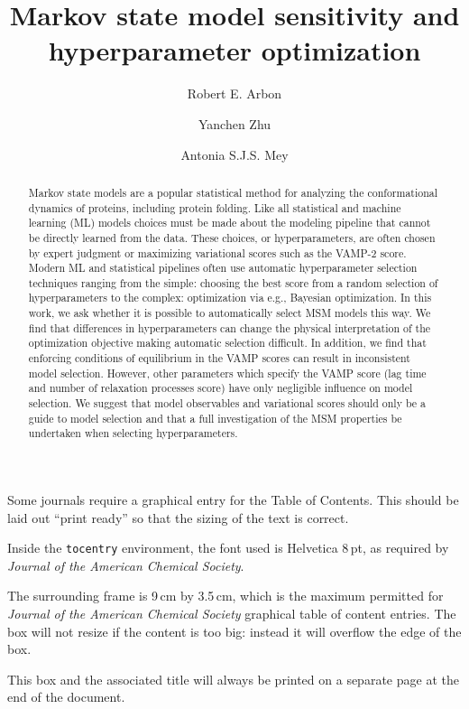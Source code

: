 \documentclass[journal=jacsat,manuscript=article]{achemso}
\author{Robert E. Arbon}
\author{Yanchen Zhu}
\author{Antonia S.J.S. Mey}
\affiliation{EaStCHEM School of Chemistry, David Brewster Road, Joseph Black Building, The King’s Buildings, Edinburgh, EH93FJ, UK}
\title[]{Markov state model sensitivity and hyperparameter optimization}
\begin{document}
\begin{tocentry}

Some journals require a graphical entry for the Table of Contents.
This should be laid out ``print ready'' so that the sizing of the
text is correct.

Inside the \texttt{tocentry} environment, the font used is Helvetica
8\,pt, as required by \emph{Journal of the American Chemical
Society}.

The surrounding frame is 9\,cm by 3.5\,cm, which is the maximum
permitted for  \emph{Journal of the American Chemical Society}
graphical table of content entries. The box will not resize if the
content is too big: instead it will overflow the edge of the box.

This box and the associated title will always be printed on a
separate page at the end of the document.

\end{tocentry}

\begin{abstract}
Markov state models are a popular statistical method for analyzing the conformational dynamics of proteins, including protein folding. Like all statistical and machine learning (ML) models choices must be made about the modeling pipeline that cannot be directly learned from the data. These choices, or hyperparameters, are often chosen by expert judgment or maximizing variational scores such as the VAMP-2 score. Modern ML and statistical pipelines often use automatic hyperparameter selection techniques ranging from the simple: choosing the best score from a random selection of hyperparameters to the complex: optimization via e.g., Bayesian optimization. In this work, we ask whether it is possible to automatically select MSM models this way. We find that differences in hyperparameters can change the physical interpretation of the optimization objective making automatic selection difficult. In addition, we find that enforcing conditions of equilibrium in the VAMP scores can result in inconsistent model selection. However, other parameters which specify the VAMP score (lag time and number of relaxation processes score) have only negligible influence on model selection.  We suggest that model observables and variational scores should only be a guide to model selection and that a full investigation of the MSM properties be undertaken when selecting hyperparameters. 
\end{abstract}
\end{document}
